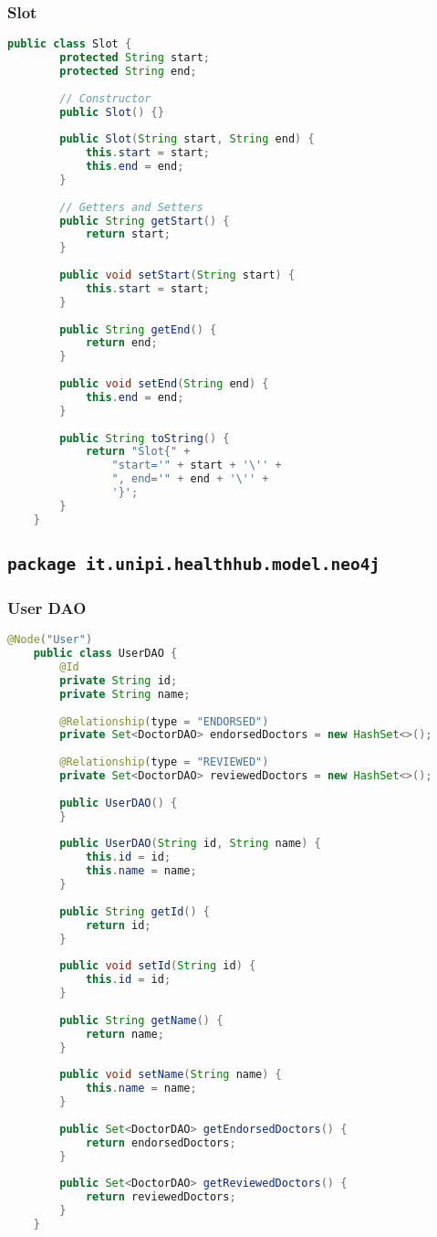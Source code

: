 \subsubsection{Slot}
\begin{lstlisting}[language=java]
	public class Slot {
		protected String start;
		protected String end;
		
		// Constructor
		public Slot() {}
		
		public Slot(String start, String end) {
			this.start = start;
			this.end = end;
		}
		
		// Getters and Setters
		public String getStart() {
			return start;
		}
		
		public void setStart(String start) {
			this.start = start;
		}
		
		public String getEnd() {
			return end;
		}
		
		public void setEnd(String end) {
			this.end = end;
		}
		
		public String toString() {
			return "Slot{" +
				"start='" + start + '\'' +
				", end='" + end + '\'' +
				'}';
		}
	}
\end{lstlisting}



\subsection{\texttt{package it.unipi.healthhub.model.neo4j}}

\subsubsection{User DAO}
\begin{lstlisting}[language=java]
	@Node("User")
	public class UserDAO {
		@Id
		private String id;
		private String name;
		
		@Relationship(type = "ENDORSED")
		private Set<DoctorDAO> endorsedDoctors = new HashSet<>();
		
		@Relationship(type = "REVIEWED")
		private Set<DoctorDAO> reviewedDoctors = new HashSet<>();
		
		public UserDAO() {
		}
		
		public UserDAO(String id, String name) {
			this.id = id;
			this.name = name;
		}
		
		public String getId() {
			return id;
		}
		
		public void setId(String id) {
			this.id = id;
		}
		
		public String getName() {
			return name;
		}
		
		public void setName(String name) {
			this.name = name;
		}
		
		public Set<DoctorDAO> getEndorsedDoctors() {
			return endorsedDoctors;
		}
		
		public Set<DoctorDAO> getReviewedDoctors() {
			return reviewedDoctors;
		}
	}
\end{lstlisting}


